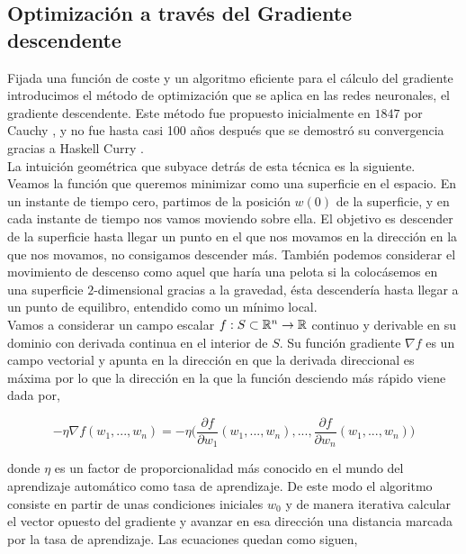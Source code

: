     \subsection{Optimización a través del Gradiente descendente}

    Fijada una función de coste y un algoritmo eficiente para el cálculo del gradiente introducimos el método de optimización que se aplica en las redes neuronales, el gradiente descendente. Este método fue propuesto inicialmente en $1847$ por Cauchy \cite{cauchy1847methode}, y no fue hasta casi 100 años después que se demostró su convergencia gracias a Haskell Curry \cite{curry1944method}. \\
    
    La intuición geométrica que subyace detrás de esta técnica es la siguiente. Veamos la función que queremos minimizar como una superficie en el espacio. En un instante de tiempo cero, partimos de la posición $w(0)$ de la superficie, y en cada instante de tiempo nos vamos moviendo sobre ella. El objetivo es descender de la superficie hasta llegar un punto en el que nos movamos en la dirección en la que nos movamos, no consigamos descender más. También podemos considerar el movimiento de descenso como aquel que haría una pelota si la colocásemos en una superficie $2$-dimensional gracias a la gravedad, ésta descendería hasta llegar a un punto de equilibro, entendido como un mínimo local. \\
    
    Vamos a considerar un campo escalar $f:S \subset \mathbb{R}^n \to \mathbb{R}$ continuo y derivable en su dominio con derivada continua en el interior de $S$. Su función gradiente $\nabla f$ es un campo vectorial y apunta en la dirección en que la derivada direccional es máxima por lo que la dirección en la que la función desciendo más rápido viene dada por,
    
    \begin{equation}
        -\eta \nabla f(w_1,...,w_n) = -\eta \Big( \frac{\partial f}{\partial w_1} (w_1,...,w_n),...,\frac{\partial f}{\partial w_n}(w_1,...,w_n) \Big)
    \end{equation}

    \noindent donde $\eta$ es un factor de proporcionalidad más conocido en el mundo del aprendizaje automático como tasa de aprendizaje. De este modo el algoritmo consiste en partir de unas condiciones iniciales $w_0$ y de manera iterativa calcular el vector opuesto del gradiente y avanzar en esa dirección una distancia marcada por la tasa de aprendizaje. Las ecuaciones quedan como siguen,
    
